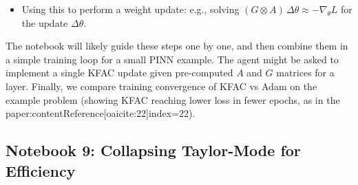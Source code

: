 \documentclass[11pt]{article}
\begin{document}
\begin{description}
\begin{itemize}
      \item Using this to perform a weight update: e.g., solving $(G \otimes A) \, \Delta\theta \approx -\nabla_\theta L$ for the update $\Delta\theta$.
    \end{itemize}
  The notebook will likely guide these steps one by one, and then combine them in a simple training loop for a small PINN example. The agent might be asked to implement a single KFAC update given pre-computed $A$ and $G$ matrices for a layer. Finally, we compare training convergence of KFAC vs Adam on the example problem (showing KFAC reaching lower loss in fewer epochs, as in the paper:contentReference[oaicite:22]{index=22}).
\end{description}

\subsection{Notebook 9: Collapsing Taylor-Mode for Efficiency}
\end{document}
